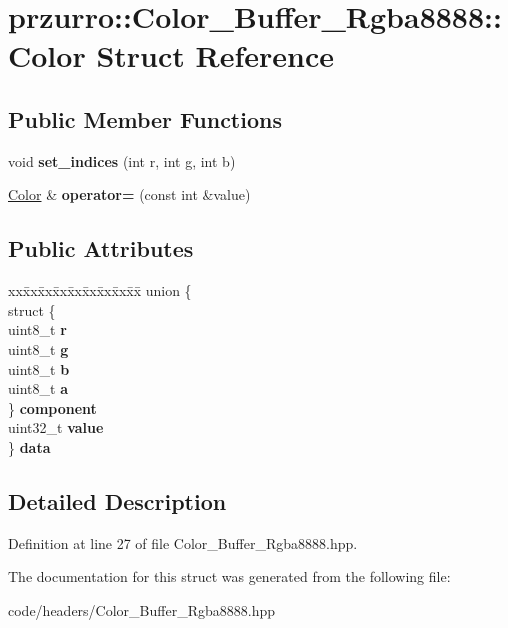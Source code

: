 \hypertarget{structprzurro_1_1_color___buffer___rgba8888_1_1_color}{}\section{przurro\+::Color\+\_\+\+Buffer\+\_\+\+Rgba8888\+::Color Struct Reference}
\label{structprzurro_1_1_color___buffer___rgba8888_1_1_color}
\subsection*{Public Member Functions}
\begin{DoxyCompactItemize}
\item 
\mbox{\label{structprzurro_1_1_color___buffer___rgba8888_1_1_color_ab9b04b7e65dbd15d6ba7de2b611d0c7d}} 
void {\bfseries set\+\_\+indices} (int r, int g, int b)
\item 
\mbox{\label{structprzurro_1_1_color___buffer___rgba8888_1_1_color_aca0f19bbe20e4b01467de10a00f1110f}} 
\mbox{\hyperlink{structprzurro_1_1_color___buffer___rgba8888_1_1_color}{Color}} \& {\bfseries operator=} (const int \&value)
\end{DoxyCompactItemize}
\subsection*{Public Attributes}
\begin{DoxyCompactItemize}
\item 
\mbox{\label{structprzurro_1_1_color___buffer___rgba8888_1_1_color_acfdfd445cdd1f419ba0376cdd585715c}} 
\begin{tabbing}
xx\=xx\=xx\=xx\=xx\=xx\=xx\=xx\=xx\=\kill
union \{\\
\>struct \{\\
\>\>uint8\_t {\bfseries r}\\
\>\>uint8\_t {\bfseries g}\\
\>\>uint8\_t {\bfseries b}\\
\>\>uint8\_t {\bfseries a}\\
\>\} {\bfseries component}\\
\>uint32\_t {\bfseries value}\\
\} {\bfseries data}\\

\end{tabbing}\end{DoxyCompactItemize}


\subsection{Detailed Description}


Definition at line 27 of file Color\+\_\+\+Buffer\+\_\+\+Rgba8888.\+hpp.



The documentation for this struct was generated from the following file\+:\begin{DoxyCompactItemize}
\item 
code/headers/Color\+\_\+\+Buffer\+\_\+\+Rgba8888.\+hpp\end{DoxyCompactItemize}
